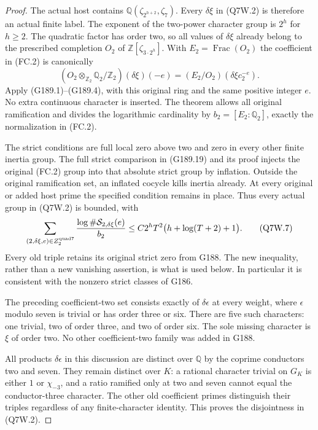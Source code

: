 \begin{proof}
The actual host contains $\mathbb Q(\zeta_{2^{h+2}},\zeta_7)$.
Every $\delta\xi$ in (Q7W.2) is therefore an actual finite label.
The exponent of the two-power character group is $2^h$ for
$h\geq2$.  The quadratic factor has order two, so all values of
$\delta\xi$ already belong to the prescribed completion $O_2$
of $\mathbb Z[\zeta_{3\cdot2^h}]$.
With $E_2=\operatorname{Frac}(O_2)$ the coefficient in (FC.2) is
canonically
\[
 (O_2\otimes_{\mathbb Z_2}\mathbb Q_2/\mathbb Z_2)
                     (\delta\xi)(-e)
             =(E_2/O_2)(\delta\xi c_2^{-e}).
 \tag{Q7W.6}
\]
Apply (G189.1)--(G189.4), with this original ring and the same
positive integer $e$.  No extra continuous character is inserted.
The theorem allows all original ramification and divides the
logarithmic cardinality by $b_2=[E_2:\mathbb Q_2]$, exactly
the normalization in (FC.2).

The strict conditions are full local zero above two and zero
in every other finite inertia group.  The full strict comparison
in (G189.19) and its proof injects the original (FC.2) group
into that absolute strict group by inflation.
Outside the original ramification set, an inflated cocycle kills
inertia already.  At every original or added host prime the
specified condition remains in place.  Thus every actual group
in (Q7W.2) is bounded, with
\[
 \sum_{(2,\delta\xi,e)\in Z^{\rm quad7}_2}
          \frac{\log\#\mathcal S_{2,\delta\xi}(e)}{b_2}
       \leq C2^hT^2\bigl(h+\log(T+2)+1\bigr).
 \tag{Q7W.7}
\]
Every old triple retains its original strict zero from G188.
The new inequality, rather than a new vanishing assertion, is
what is used below.  In particular it is consistent with the
nonzero strict classes of G186.

The preceding coefficient-two set consists exactly of
$\delta\epsilon$ at every weight, where $\epsilon$ modulo seven
is trivial or has order three or six.
There are five such characters: one trivial, two of order three,
and two of order six.  The sole missing character is $\xi$ of
order two.  No other coefficient-two family was added in G188.

All products $\delta\epsilon$ in this discussion are distinct
over $\mathbb Q$ by the coprime conductors two and seven.
They remain distinct over $K$: a rational character trivial on
$G_K$ is either $1$ or $\chi_{-3}$, and a ratio ramified only
at two and seven cannot equal the conductor-three character.
The other old coefficient primes distinguish their triples
regardless of any finite-character identity.
This proves the disjointness in (Q7W.2).


\end{proof}
